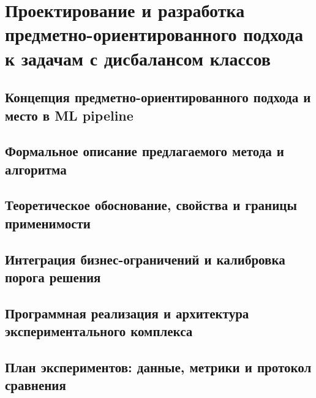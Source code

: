 \section[Проектирование и разработка предметно-ориентированного подхода]{Проектирование и разработка предметно-ориентированного подхода к задачам с дисбалансом классов}
\label{sec:chapter2}

\subsection{Концепция предметно-ориентированного подхода и место в ML pipeline}
\label{sec:ch2-1}

\subsection{Формальное описание предлагаемого метода и алгоритма}
\label{sec:ch2-2}

\subsection{Теоретическое обоснование, свойства и границы применимости}
\label{sec:ch2-3}

\subsection{Интеграция бизнес-ограничений и калибровка порога решения}
\label{sec:ch2-4}

\subsection{Программная реализация и архитектура экспериментального комплекса}
\label{sec:ch2-5}

\subsection{План экспериментов: данные, метрики и протокол сравнения}
\label{sec:ch2-6}
